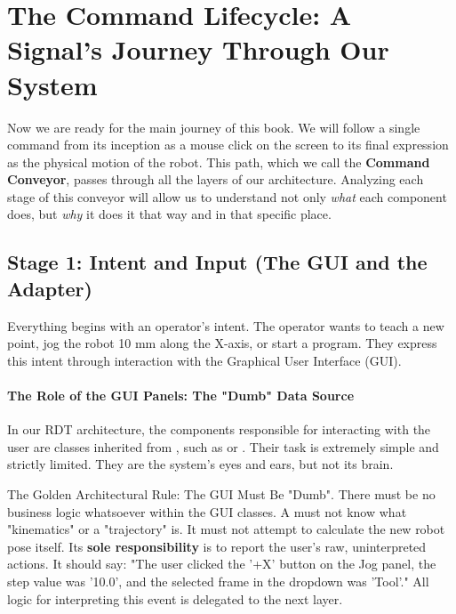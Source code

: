 \section{The Command Lifecycle: A Signal's Journey Through Our System}
\label{sec:command_lifecycle}

Now we are ready for the main journey of this book. We will follow a single command from its inception as a mouse click on the screen to its final expression as the physical motion of the robot. This path, which we call the \textbf{Command Conveyor}, passes through all the layers of our architecture. Analyzing each stage of this conveyor will allow us to understand not only \textit{what} each component does, but \textit{why} it does it that way and in that specific place.

\subsection{Stage 1: Intent and Input (The GUI and the Adapter)}
\label{subsec:stage1_gui_adapter}

Everything begins with an operator's intent. The operator wants to teach a new point, jog the robot 10 mm along the X-axis, or start a program. They express this intent through interaction with the Graphical User Interface (GUI).

\paragraph{The Role of the GUI Panels: The "Dumb" Data Source}
In our RDT architecture, the components responsible for interacting with the user are classes inherited from , such as  or . Their task is extremely simple and strictly limited. They are the system's eyes and ears, but not its brain.

\begin{dangerbox}{The Golden Architectural Rule: The GUI Must Be "Dumb".}
    There must be no business logic whatsoever within the GUI classes. A  must not know what "kinematics" or a "trajectory" is. It must not attempt to calculate the new robot pose itself. Its \textbf{sole responsibility} is to report the user's raw, uninterpreted actions. It should say: "The user clicked the '+X' button on the Jog panel, the step value was '10.0', and the selected frame in the dropdown was 'Tool'." All logic for interpreting this event is delegated to the next layer.
\end{dangerbox}

